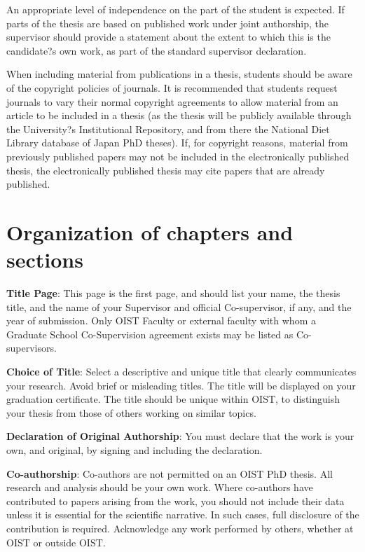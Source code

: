 An appropriate level of independence on the part of the student is expected. If parts of the thesis are based on published work under joint authorship, the supervisor should provide a statement about the extent to which this is the candidate?s own work, as part of the standard supervisor declaration.

When including material from publications in a thesis, students should be aware of the copyright policies of journals. It is recommended that students request journals to vary their normal copyright agreements to allow material from an article to be included in a thesis (as the thesis will be publicly available through the University?s Institutional Repository, and from there the National Diet Library database of Japan PhD theses). If, for copyright reasons, material from previously published papers may not be included in the electronically published thesis, the electronically published thesis may cite papers that are already published.

\section{Organization of chapters and sections}

\textbf{Title Page}:  This page is the first page, and should list your name, the thesis title, and the name of your Supervisor and official Co-supervisor, if any, and the year of submission.  Only OIST Faculty or external faculty with whom a Graduate School Co-Supervision agreement exists may be listed as Co-supervisors.

\textbf{Choice of Title}: Select a descriptive and unique title that clearly communicates your research.  Avoid brief or misleading titles.  The title will be displayed on your graduation certificate.  The title should be unique within OIST, to distinguish your thesis from those of others working on similar topics.

\textbf{Declaration of Original Authorship}:  You must declare that the work is your own, and original, by signing and including the declaration.  

\textbf{Co-authorship}:  Co-authors are not permitted on an OIST PhD thesis. All research and analysis should be your own work. Where co-authors have contributed to papers arising from the work, you should not include their data unless it is essential for the scientific narrative.  In such cases, full disclosure of the contribution is required. Acknowledge any work performed by others, whether at OIST or outside OIST.

